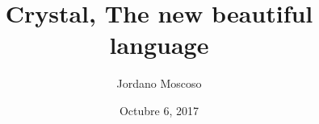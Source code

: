 \documentclass{article}
\begin{document}
\title{Crystal, The new beautiful language}
\author{Jordano Moscoso}
\date{Octubre 6, 2017}
\maketitle
\end{document}
